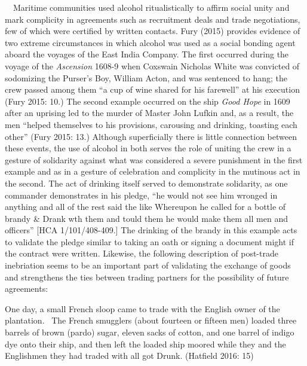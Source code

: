 \begin{styleStandard}
\ \ Maritime communities used alcohol ritualistically to affirm social unity and mark complicity in agreements such as recruitment deals and trade negotiations, few of which were certified by written contacts. Fury (2015) provides evidence of two extreme circumstances in which alcohol was used as a social bonding agent aboard the voyages of the East India Company. The first occurred during the voyage of the \textit{Ascension }1608-9 when Coxswain Nicholas White was convicted of sodomizing the Purser’s Boy, William Acton, and was sentenced to hang; the crew passed among them “a cup of wine shared for his farewell” at his execution (Fury 2015: 10.) The second example occurred on the ship \textit{Good Hope} in 1609 after an uprising led to the murder of Master John Lufkin and, as a result, the men “helped themselves to his provisions, carousing and drinking, toasting each other” (Fury 2015: 13.) Although superficially there is little connection between these events, the use of alcohol in both serves the role of uniting the crew in a gesture of solidarity against what was considered a severe punishment in the first example and as in a gesture of celebration and complicity in the mutinous act in the second. The act of drinking itself served to demonstrate solidarity, as one commander demonstrates in his pledge, “he would not see him wronged in anything and all of the rest said the like Whereupon he called for a bottle of brandy \& Drank wth them and tould them he would make them all men and officers” [HCA 1/101/408-409.] The drinking of the brandy in this example acts to validate the pledge similar to taking an oath or signing a document might if the contract were written. Likewise, the following description of post-trade inebriation seems to be an important part of validating the exchange of goods and strengthens the ties between trading partners for the possibility of future agreements:
\end{styleStandard}

\begin{styleStandard}
One day, a small French sloop came to trade with the English owner of the plantation. \ The French smugglers (about fourteen or fifteen men) loaded three barrels of brown (pardo) sugar, eleven sacks of cotton, and one barrel of indigo dye onto their ship, and then left the loaded ship moored while they and the Englishmen they had traded with all got Drunk. (Hatfield 2016: 15) 
\end{styleStandard}

